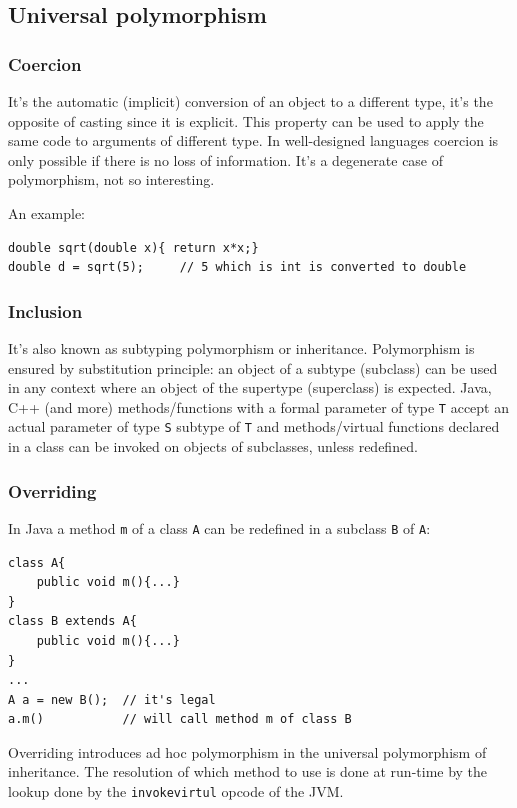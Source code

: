 \subsection{Universal polymorphism}
\subsubsection{Coercion}
It's the automatic (implicit) conversion of an object to a different type, it's the opposite of casting since it is explicit.
This property can be used to apply the same code to arguments of different type.
In well-designed languages coercion is only possible if there is no loss of information.
It's a degenerate case of polymorphism, not so interesting.

An example:
\begin{verbatim}
double sqrt(double x){ return x*x;}
double d = sqrt(5);     // 5 which is int is converted to double
\end{verbatim}

\subsubsection{Inclusion}
It's also known as subtyping polymorphism or inheritance.
Polymorphism is ensured by substitution principle: an object of a subtype (subclass) can be used in any context where an object of the supertype (superclass) is expected.
Java, C++ (and more) methods/functions with a formal parameter of type \verb|T| accept an actual parameter of type \verb|S| subtype of \verb|T| and methods/virtual functions declared in a class can be invoked on objects of subclasses, unless redefined.

\subsubsection{Overriding}
In Java a method \verb|m| of a class \verb|A| can be redefined in a subclass \verb|B| of \verb|A|:
\begin{verbatim}
class A{
    public void m(){...}
}
class B extends A{
    public void m(){...}
}
...
A a = new B();  // it's legal
a.m()           // will call method m of class B
\end{verbatim}

Overriding introduces ad hoc polymorphism in the universal polymorphism of inheritance.
The resolution of which method to use is done at run-time by the lookup done by the \verb|invokevirtul| opcode of the JVM.

